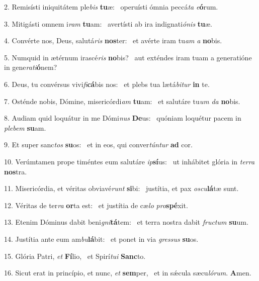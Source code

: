 2. Remisísti iniquitátem ple\textit{bis} \textbf{tu}æ: \ast\  operuísti ómnia peccá\textit{ta} \textit{e}\textbf{ó}rum.\

3. Mitigásti omnem i\textit{ram} \textbf{tu}am: \ast\  avertísti ab ira indignati\textit{ó}\textit{nis} \textbf{tu}æ.\

4. Convérte nos, Deus, salutá\textit{ris} \textbf{nos}ter: \ast\  et avérte iram tu\textit{am} \textit{a} \textbf{no}bis.\

5. Numquid in ætérnum irascé\textit{ris} \textbf{no}bis? \ast\  aut exténdes iram tuam a generatióne in gene\textit{ra}\textit{ti}\textbf{ó}nem?\

6. Deus, tu convérsus vivi\textit{fi}\textbf{cá}bis nos: \ast\  et plebs tua lætá\textit{bi}\textit{tur} \textbf{in} te.\

7. Osténde nobis, Dómine, misericórdi\textit{am} \textbf{tu}am: \ast\  et salutáre tu\textit{um} \textit{da} \textbf{no}bis.\

8. Audiam quid loquátur in me Dómi\textit{nus} \textbf{De}us: \ast\  quóniam loquétur pacem in \textit{ple}\textit{bem} \textbf{su}am.\

9. Et super sanc\textit{tos} \textbf{su}os: \ast\  et in eos, qui conver\textit{tún}\textit{tur} \textbf{ad} cor.\

10. Verúmtamen prope timéntes eum salutáre \textit{ip}\textbf{sí}us: \ast\  ut inhábitet glória in \textit{ter}\textit{ra} \textbf{nos}tra.\

11. Misericórdia, et véritas obviavé\textit{runt} \textbf{si}bi: \ast\  justítia, et pax \textit{os}\textit{cu}\textbf{lá}tæ sunt.\

12. Véritas de ter\textit{ra} \textbf{or}ta est: \ast\  et justítia de cæ\textit{lo} \textit{pro}\textbf{spé}xit.\

13. Etenim Dóminus dabit beni\textit{gni}\textbf{tá}tem: \ast\  et terra nostra dabit \textit{fruc}\textit{tum} \textbf{su}um.\

14. Justítia ante eum am\textit{bu}\textbf{lá}bit: \ast\  et ponet in via \textit{gres}\textit{sus} \textbf{su}os.\

15. Glória Patri, \textit{et} \textbf{Fí}lio, \ast\  et Spirí\textit{tu}\textit{i} \textbf{Sanc}to.\

16. Sicut erat in princípio, et nunc, \textit{et} \textbf{sem}per, \ast\  et in sǽcula sæcu\textit{ló}\textit{rum}. \textbf{A}men.\

